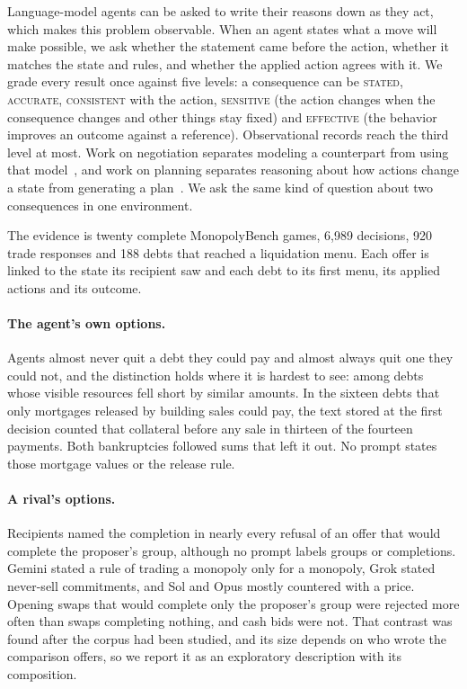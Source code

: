 \documentclass[11pt,letterpaper]{article}
\newcommand{\Level}[1]{\textsc{#1}}
\begin{document}
Language-model agents can be asked to write their reasons down as they act, which makes this problem observable. When an agent states what a move will make possible, we ask whether the statement came before the action, whether it matches the state and rules, and whether the applied action agrees with it. We grade every result once against five levels: a consequence can be \Level{stated}, \Level{accurate}, \Level{consistent} with the action, \Level{sensitive} (the action changes when the consequence changes and other things stay fixed) and \Level{effective} (the behavior improves an outcome against a reference). Observational records reach the third level at most. Work on negotiation separates modeling a counterpart from using that model~\citep{cosentino2026counterparty}, and work on planning separates reasoning about how actions change a state from generating a plan~\citep{valmeekam2023planbench}. We ask the same kind of question about two consequences in one environment.

The evidence is twenty complete MonopolyBench games, 6,989 decisions, 920 trade responses and 188 debts that reached a liquidation menu. Each offer is linked to the state its recipient saw and each debt to its first menu, its applied actions and its outcome.

\paragraph{The agent's own options.} Agents almost never quit a debt they could pay and almost always quit one they could not, and the distinction holds where it is hardest to see: among debts whose visible resources fell short by similar amounts. In the sixteen debts that only mortgages released by building sales could pay, the text stored at the first decision counted that collateral before any sale in thirteen of the fourteen payments. Both bankruptcies followed sums that left it out. No prompt states those mortgage values or the release rule.

\paragraph{A rival's options.} Recipients named the completion in nearly every refusal of an offer that would complete the proposer's group, although no prompt labels groups or completions. Gemini stated a rule of trading a monopoly only for a monopoly, Grok stated never-sell commitments, and Sol and Opus mostly countered with a price. Opening swaps that would complete only the proposer's group were rejected more often than swaps completing nothing, and cash bids were not. That contrast was found after the corpus had been studied, and its size depends on who wrote the comparison offers, so we report it as an exploratory description with its composition.
\end{document}
